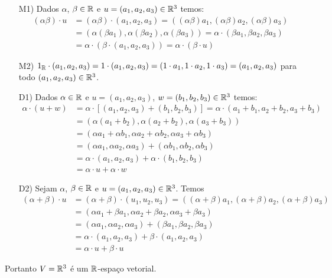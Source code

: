 \begin{exemplo}
\begin{enumerate}[label={\arabic*})]
\begin{solucao}
\begin{enumerate}
					\item[M1)] Dados $\alpha$, $\beta \in \mathbb{R}$ e $u = (a_1, a_2, a_3) \in \mathbb{R}^3$ temos:
						\begin{align*}
							(\alpha\beta)\cdot u &= (\alpha \beta)\cdot (a_1, a_2, a_3) = ((\alpha\beta)a_1, (\alpha\beta)a_2, (\alpha\beta)a_3) \\ &= (\alpha(\beta a_1), \alpha(\beta a_2), \alpha(\beta a_3)) = \alpha\cdot(\beta a_1, \beta a_2, \beta a_3)\\ & = \alpha\cdot(\beta\cdot(a_1, a_2, a_3)) = \alpha\cdot(\beta\cdot u)
						\end{align*}

					\item[M2)] $1_{\mathbb{R}} \cdot (a_1, a_2, a_3) = 1 \cdot (a_1, a_2, a_3) = (1\cdot a_1, 1\cdot a_2, 1\cdot a_3) = (a_1, a_2, a_3)$ para todo $(a_1, a_2, a_3) \in \mathbb{R}^3$.
					
					\item[D1)] Dados $\alpha \in \mathbb{R}$ e $u = (a_1, a_2, a_3)$, $w = (b_1, b_2, b_3) \in \mathbb{R}^3$ temos:
						\begin{align*}
							\alpha\cdot(u + w) &= \alpha\cdot[(a_1, a_2, a_3) + (b_1, b_2, b_3)] = \alpha\cdot(a_1 + b_1, a_2 + b_2, a_3 + b_3) \\ &= (\alpha(a_1 + b_2), \alpha(a_2 + b_2), \alpha(a_3 + b_3))\\ &= (\alpha a_1 + \alpha b_1, \alpha a_2 + \alpha b_2, \alpha a_3 + \alpha b_3) \\ &= (\alpha a_1, \alpha a_2, \alpha a_3) + (\alpha b_1, \alpha b_2, \alpha b_3)\\ &= \alpha\cdot(a_1, a_2, a_3) + \alpha\cdot(b_1, b_2, b_3) \\ &= \alpha\cdot u + \alpha\cdot w
						\end{align*}

					\item[D2)] Sejam $\alpha$, $\beta \in \mathbb{R}$ e $u = (a_1, a_2, a_3) \in \mathbb{R}^3$. Temos
						\begin{align*}
							(\alpha + \beta)\cdot u &= (\alpha + \beta)\cdot(u_1, u_2, u_ 3) = ((\alpha + \beta)a_1, (\alpha + \beta)a_2, (\alpha + \beta)a_3) \\ &= (\alpha a_1 + \beta a_1, \alpha a_2 + \beta a_2, \alpha a_3 + \beta a_3) \\ &= (\alpha a_1, \alpha a_2, \alpha a_3) + (\beta a_1, \beta a_2, \beta a_3) \\ &= \alpha\cdot(a_1, a_2, a_3) + \beta\cdot(a_1, a_2, a_3) \\ &= \alpha\cdot u + \beta\cdot u
						\end{align*}
			\end{enumerate}
			Portanto $V = \mathbb{R}^3$ \'e um $\mathbb{R}$-espa\c{c}o vetorial.
		\end{solucao}


\end{enumerate}
\end{exemplo}
